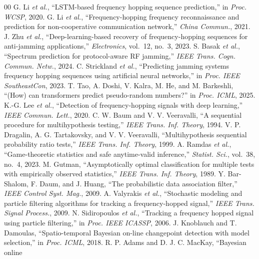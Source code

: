 \documentclass[conference]{IEEEtran}
\begin{document}
\begin{thebibliography}{00}
 G. Li \emph{et al.}, ``LSTM-based frequency hopping
sequence prediction,'' in \emph{Proc. WCSP}, 2020.
 G. Li \emph{et al.}, ``Frequency-hopping frequency
reconnaissance and prediction for non-cooperative communication network,''
\emph{China Commun.}, 2021.
 J. Zhu \emph{et al.}, ``Deep-learning-based recovery
of frequency-hopping sequences for anti-jamming applications,''
\emph{Electronics}, vol.~12, no.~3, 2023.
 S. Basak \emph{et al.}, ``Spectrum prediction for
protocol-aware RF jamming,'' \emph{IEEE Trans. Cogn. Commun. Netw.}, 2024.
 C. Strickland \emph{et al.}, ``Predicting jamming
systems frequency hopping sequences using artificial neural networks,'' in
\emph{Proc. IEEE SoutheastCon}, 2023.
 T. Tao, A. Doshi, V. Kalra, M. He, and
M. Barkeshli, ``(How) can transformers predict pseudo-random numbers?'' in
\emph{Proc. ICML}, 2025.
 K.-G. Lee \emph{et al.}, ``Detection of
frequency-hopping signals with deep learning,'' \emph{IEEE Commun. Lett.}, 2020.
 C. W. Baum and V. V. Veeravalli, ``A sequential procedure for
multihypothesis testing,'' \emph{IEEE Trans. Inf. Theory}, 1994.
 V. P. Dragalin, A. G. Tartakovsky, and V. V. Veeravalli,
``Multihypothesis sequential probability ratio tests,'' \emph{IEEE Trans. Inf.
Theory}, 1999.
 A. Ramdas \emph{et al.}, ``Game-theoretic statistics and
safe anytime-valid inference,'' \emph{Statist. Sci.}, vol.~38, no.~4, 2023.
 M. Gutman, ``Asymptotically optimal classification for
multiple tests with empirically observed statistics,'' \emph{IEEE Trans. Inf.
Theory}, 1989.
 Y. Bar-Shalom, F. Daum, and J. Huang, ``The
probabilistic data association filter,'' \emph{IEEE Control Syst. Mag.}, 2009.
 A. Valyrakis \emph{et al.}, ``Stochastic modeling and
particle filtering algorithms for tracking a frequency-hopped signal,''
\emph{IEEE Trans. Signal Process.}, 2009.
 N. Sidiropoulos \emph{et al.}, ``Tracking a frequency
hopped signal using particle filtering,'' in \emph{Proc. IEEE ICASSP}, 2006.
 J. Knoblauch and T. Damoulas, ``Spatio-temporal Bayesian
on-line changepoint detection with model selection,'' in \emph{Proc. ICML},
2018.
 R. P. Adams and D. J. C. MacKay, ``Bayesian online

\end{thebibliography}
\end{document}
